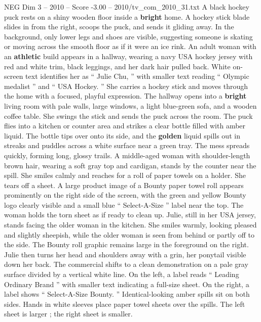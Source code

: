 \begin{textsample}{NEG Dim 3 – 2010 – Score -3.00 – 2010/tv\_com\_2010\_31.txt}  \label{ex:f3_neg_006}
A black hockey puck rests on a shiny wooden floor inside a \textbf{bright} home.
A hockey stick blade slides in from the right, scoops the puck, and sends it gliding away.
In the background, only lower legs and shoes are visible, suggesting someone is skating or moving across the smooth floor as if it were an ice rink.
An adult woman with an \textbf{athletic} build appears in a hallway, wearing a navy USA hockey jersey with red and white trim, black leggings, and her dark hair pulled back.
White on-screen text identifies her as “ Julie Chu, ” with smaller text reading “ Olympic medalist ” and “ USA Hockey. ” She carries a hockey stick and moves through the home with a focused, playful expression.
The hallway opens into a \textbf{bright} living room with pale walls, large windows, a light blue-green sofa, and a wooden coffee table.
She swings the stick and sends the puck across the room.
The puck flies into a kitchen or counter area and strikes a clear bottle filled with amber liquid.
The bottle tips over onto its side, and the \textbf{golden} liquid spills out in streaks and puddles across a white surface near a green tray.
The mess spreads quickly, forming long, glossy trails.
A middle-aged woman with shoulder-length brown hair, wearing a soft gray top and cardigan, stands by the counter near the spill.
She smiles calmly and reaches for a roll of paper towels on a holder.
She tears off a sheet.
A large product image of a Bounty paper towel roll appears prominently on the right side of the screen, with the green and yellow Bounty logo clearly visible and a small blue “ Select-A-Size ” label near the top.
The woman holds the torn sheet as if ready to clean up.
Julie, still in her USA jersey, stands facing the older woman in the kitchen.
She smiles warmly, looking pleased and slightly sheepish, while the older woman is seen from behind or partly off to the side.
The Bounty roll graphic remains large in the foreground on the right.
Julie then turns her head and shoulders away with a grin, her ponytail visible down her back.
The commercial shifts to a clean demonstration on a pale gray surface divided by a vertical white line.
On the left, a label reads “ Leading Ordinary Brand ” with smaller text indicating a full-size sheet.
On the right, a label shows “ Select-A-Size Bounty. ” Identical-looking amber spills sit on both sides.
Hands in white sleeves place paper towel sheets over the spills.
The left sheet is larger ; the right sheet is smaller.

\end{textsample}
